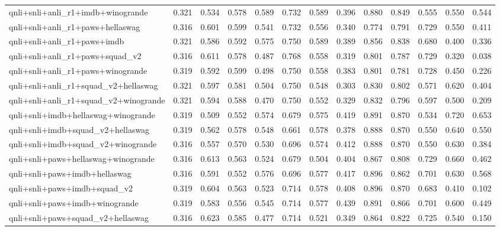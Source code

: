 \begin{table}[t]
\begin{tabular}{lrrrrrrrrrrrr}
    qnli+snli+anli\_r1+imdb+winogrande & 0.321 & 0.534 & 0.578 & 0.589 & 0.732 & 0.589 & 0.396 & 0.880 & 0.849 & 0.555 & 0.550 & 0.544 \\
    qnli+snli+anli\_r1+paws+hellaswag & 0.316 & 0.601 & 0.599 & 0.541 & 0.732 & 0.556 & 0.340 & 0.774 & 0.791 & 0.729 & 0.550 & 0.411 \\
    qnli+snli+anli\_r1+paws+imdb & 0.321 & 0.586 & 0.592 & 0.575 & 0.750 & 0.589 & 0.389 & 0.856 & 0.838 & 0.680 & 0.400 & 0.336 \\
    qnli+snli+anli\_r1+paws+squad\_v2 & 0.316 & 0.611 & 0.578 & 0.487 & 0.768 & 0.558 & 0.319 & 0.801 & 0.787 & 0.729 & 0.320 & 0.038 \\
    qnli+snli+anli\_r1+paws+winogrande & 0.319 & 0.592 & 0.599 & 0.498 & 0.750 & 0.558 & 0.383 & 0.801 & 0.781 & 0.728 & 0.450 & 0.226 \\
    qnli+snli+anli\_r1+squad\_v2+hellaswag & 0.321 & 0.597 & 0.581 & 0.504 & 0.750 & 0.548 & 0.303 & 0.830 & 0.802 & 0.571 & 0.620 & 0.404 \\
    qnli+snli+anli\_r1+squad\_v2+winogrande & 0.321 & 0.594 & 0.588 & 0.470 & 0.750 & 0.552 & 0.329 & 0.832 & 0.796 & 0.597 & 0.500 & 0.209 \\
    qnli+snli+imdb+hellaswag+winogrande & 0.319 & 0.509 & 0.552 & 0.574 & 0.679 & 0.575 & 0.419 & 0.891 & 0.870 & 0.534 & 0.720 & 0.653 \\
    qnli+snli+imdb+squad\_v2+hellaswag & 0.319 & 0.562 & 0.578 & 0.548 & 0.661 & 0.578 & 0.378 & 0.888 & 0.870 & 0.550 & 0.640 & 0.550 \\
    qnli+snli+imdb+squad\_v2+winogrande & 0.316 & 0.557 & 0.570 & 0.530 & 0.696 & 0.574 & 0.412 & 0.888 & 0.870 & 0.550 & 0.630 & 0.384 \\
    qnli+snli+paws+hellaswag+winogrande & 0.316 & 0.613 & 0.563 & 0.524 & 0.679 & 0.504 & 0.404 & 0.867 & 0.808 & 0.729 & 0.660 & 0.462 \\
    qnli+snli+paws+imdb+hellaswag & 0.316 & 0.591 & 0.552 & 0.576 & 0.696 & 0.577 & 0.417 & 0.896 & 0.862 & 0.701 & 0.630 & 0.568 \\
    qnli+snli+paws+imdb+squad\_v2 & 0.319 & 0.604 & 0.563 & 0.523 & 0.714 & 0.578 & 0.408 & 0.896 & 0.870 & 0.683 & 0.410 & 0.102 \\
    qnli+snli+paws+imdb+winogrande & 0.319 & 0.583 & 0.556 & 0.545 & 0.714 & 0.577 & 0.439 & 0.891 & 0.866 & 0.701 & 0.600 & 0.449 \\
    qnli+snli+paws+squad\_v2+hellaswag & 0.316 & 0.623 & 0.585 & 0.477 & 0.714 & 0.521 & 0.349 & 0.864 & 0.822 & 0.725 & 0.540 & 0.150 \\

\end{tabular}
\end{table}
